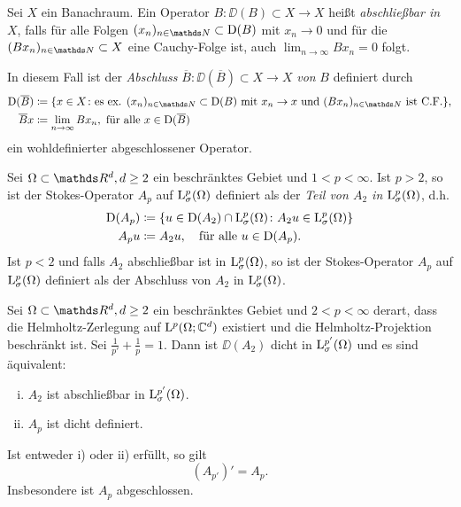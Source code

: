 \begin{defn}
  Sei $X$ ein Banachraum.
  Ein Operator $B \colon \DD(B) \subset X \to X$ heißt \emph{abschließbar in } $X$, falls für alle Folgen $(x_n)_{n \in \N} \subset \DD(B)$ mit $x_n \to 0$ und für die $(B x_n)_{n \in \N} \subset X$ eine Cauchy-Folge ist, auch $\lim_{n \to \infty} B x_n = 0$ folgt.

  In diesem Fall ist der \emph{Abschluss} $\overline B \colon \DD(\overline B) \subset X \to X$ \emph{von} $B$ definiert durch
  \begin{align*}
  \DD(\overline B) &\coloneqq \{ x \in X \colon \text{es ex. } (x_n)_{n \in \N} \subset \DD(B) \text{ mit } x_n \to x \text{ und } (B x_n)_{n \in \N} \text{ ist C.F.} \}, \\
  \overline B x &\coloneqq \lim_{n \to \infty} B x_n, \text{ für alle } x \in \DD(\overline B)
\end{align*}
ein wohldefinierter abgeschlossener Operator.
\end{defn}

\begin{defn}
  Sei $\Omega \subset \R^d, d \geq 2$ ein beschränktes Gebiet und $1 < p < \infty$.
  Ist $p > 2$, so ist der Stokes-Operator $A_p$ auf $\mathrm{L}_\sigma^p(\Omega)$ definiert als der \emph{Teil von $A_2$ in $\mathrm{L}^p_\sigma(\Omega)$}, d.h.
  \begin{align*}
    \mathrm{D}(A_p) &\coloneqq \{ u \in \mathrm{D}(A_2) \cap \mathrm{L}_\sigma^p(\Omega) \colon A_2 u \in \mathrm{L}_\sigma^p(\Omega) \} \\
    A_p u &\coloneqq A_2 u, \quad\text{für alle } u \in \mathrm{D}(A_p).
  \end{align*}
  Ist $p < 2$ und falls $A_2$ abschließbar ist in $\mathrm{L}_\sigma^p(\Omega)$, so ist der Stokes-Operator $A_p$ auf $\mathrm{L}_\sigma^p(\Omega)$ definiert als der Abschluss von $A_2$ in $\mathrm{L}_\sigma^p(\Omega)$.
\end{defn}

\begin{prop}
  Sei $\Omega \subset \R^d, d\geq 2$ ein beschränktes Gebiet und $2 < p < \infty$ derart, dass die Helmholtz-Zerlegung auf $\mathrm{L}^p(\Omega; \mathbb{C}^d)$ existiert und die Helmholtz-Projektion beschränkt ist.
  Sei $\frac{1}{p'} + \frac{1}{p} = 1$.
  Dann ist $\DD(A_2)$ dicht in $\mathrm{L}_\sigma^{p'}(\Omega)$ und es sind äquivalent:
  \begin{enumerate}[i)]
    \item $A_2$ ist abschließbar in $\mathrm{L}_\sigma^{p'}(\Omega)$.
    \item $A_p$ ist dicht definiert.
  \end{enumerate}
  Ist entweder i) oder ii) erfüllt, so gilt
  $$
  (A_{p'})' = A_p.
  $$
  Insbesondere ist $A_p$ abgeschlossen.
\end{prop}

